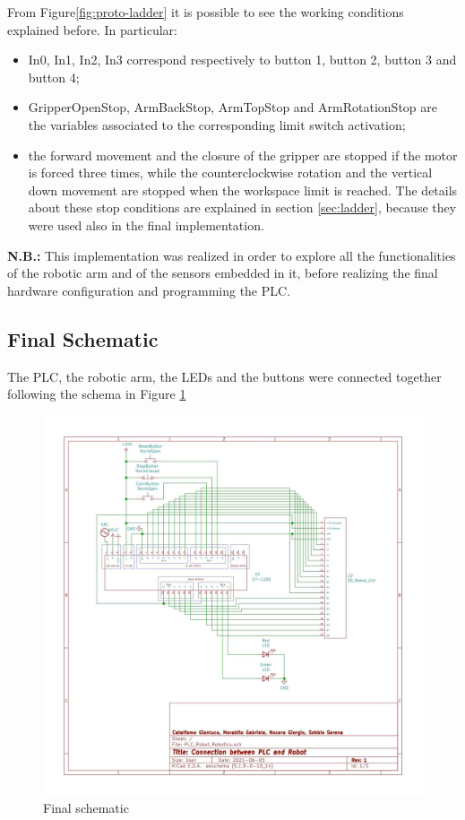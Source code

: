 From Figure\ref{fig:proto-ladder} it is possible to see the working conditions explained before. In particular:
\begin{itemize}
    \item In0, In1, In2, In3 correspond respectively to button 1, button 2, button 3 and button 4;
    \item GripperOpenStop, ArmBackStop, ArmTopStop and ArmRotationStop are the variables associated to the corresponding limit switch activation;
    \item the forward movement and the closure of the gripper are stopped if the motor is forced three times, while the counterclockwise rotation and the vertical down movement are stopped when the workspace limit is reached. The details about these stop conditions are explained in section \ref{sec:ladder}, because they were used also in the final implementation. 
\end{itemize}
\textbf{N.B.:} This implementation was realized in order to explore all the functionalities of the robotic arm and of the sensors embedded in it, before realizing the final hardware configuration and programming the PLC.

\subsection{Final Schematic}
The PLC, the robotic arm, the LEDs and the buttons were connected together following the schema in Figure \ref{fig:final_schematic}

\begin{figure}[!h]
\begin{center}
\includegraphics[width=1\linewidth]{capitolo3/figure/final_schematic.png}
\caption{Final schematic}
\label{fig:final_schematic}
\end{center}
\end{figure}

